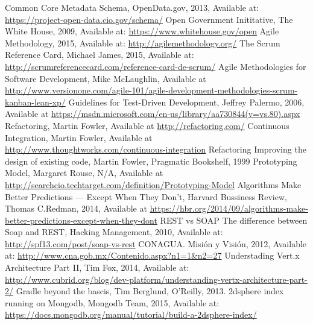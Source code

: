 \begin{thebibliography}{1}
    Common Core Metadata Schema, OpenData.gov, 2013, Available at: \url{https://project-open-data.cio.gov/schema/}
    Open Government Inititative, The White House, 2009, Available at: \url{https://www.whitehouse.gov/open}
    Agile Methodology, 2015, Available at: \url{http://agilemethodology.org/}
    The Scrum Reference Card, Michael James, 2015, Available at: \url{http://scrumreferencecard.com/reference-card-de-scrum/}
    Agile Methodologies for Software Development, Mike McLaughlin, Available at \url{http://www.versionone.com/agile-101/agile-development-methodologies-scrum-kanban-lean-xp/}
    Guidelines for Test-Driven Development, Jeffrey Palermo, 2006, Available at \url{https://msdn.microsoft.com/en-us/library/aa730844(v=vs.80).aspx}
    Refactoring, Martin Fowler, Available at \url{http://refactoring.com/}
    Continuous Integration, Martin Fowler, Available at \url{http://www.thoughtworks.com/continuous-integration}
     Refactoring \: Improving the design of existing code, Martin Fowler, Pragmatic Bookshelf, 1999
     Prototyping Model, Margaret Rouse, N/A, Available at \url{http://searchcio.techtarget.com/definition/Prototyping-Model}
    Algorithms Make Better Predictions — Except When They Don’t, Harvard Bussiness Review, Thomas C.Redman, 2014, Available at \url{https://hbr.org/2014/09/algorithms-make-better-predictions-except-when-they-dont}
    REST vs SOAP\: The difference between Soap and REST, Hacking Management, 2010, Available at: \url{http://spf13.com/post/soap-vs-rest}
    CONAGUA. Misión y Visión, 2012, Available at: \url{http://www.cna.gob.mx/Contenido.aspx?n1=1&n2=27}
    Understading Vert.x Architecture Part II, Tim Fox, 2014, Available at: \url{http://www.cubrid.org/blog/dev-platform/understanding-vertx-architecture-part-2/}
    Gradle beyond the bascis, Tim Berglund, O'Reilly, 2013.
    2dsphere index running on Mongodb, Mongodb Team, 2015, Available at: \url{https://docs.mongodb.org/manual/tutorial/build-a-2dsphere-index/}
\end{thebibliography}

